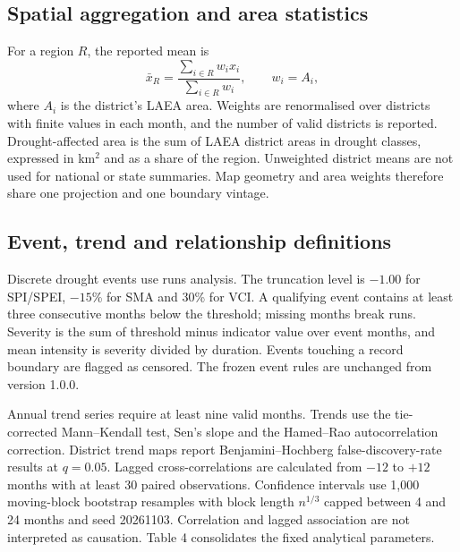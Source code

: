 \documentclass[11pt,a4paper]{article}
\begin{document}
\subsection*{Spatial aggregation and area statistics}
For a region $R$, the reported mean is
\[
\bar{x}_R=\frac{\sum_{i\in R} w_i x_i}{\sum_{i\in R} w_i},\qquad w_i=A_i,
\]
where $A_i$ is the district's LAEA area. Weights are renormalised over districts with finite values in each month, and the number of valid districts is reported. Drought-affected area is the sum of LAEA district areas in drought classes, expressed in km$^2$ and as a share of the region. Unweighted district means are not used for national or state summaries. Map geometry and area weights therefore share one projection and one boundary vintage.

\subsection*{Event, trend and relationship definitions}
Discrete drought events use runs analysis\citep{Yevjevich1967}. The truncation level is $-1.00$ for SPI/SPEI, $-15$\% for SMA and 30\% for VCI. A qualifying event contains at least three consecutive months below the threshold; missing months break runs. Severity is the sum of threshold minus indicator value over event months, and mean intensity is severity divided by duration. Events touching a record boundary are flagged as censored. The frozen event rules are unchanged from version 1.0.0.

Annual trend series require at least nine valid months. Trends use the tie-corrected Mann--Kendall test\citep{Mann1945}, Sen's slope\citep{Sen1968} and the Hamed--Rao autocorrelation correction\citep{HamedRao1998}. District trend maps report Benjamini--Hochberg false-discovery-rate results at $q=0.05$\citep{BenjaminiHochberg1995}. Lagged cross-correlations are calculated from $-12$ to $+12$ months with at least 30 paired observations. Confidence intervals use 1,000 moving-block bootstrap resamples with block length $n^{1/3}$ capped between 4 and 24 months and seed 20261103\citep{Kunsch1989}. Correlation and lagged association are not interpreted as causation. Table 4 consolidates the fixed analytical parameters.
\end{document}
